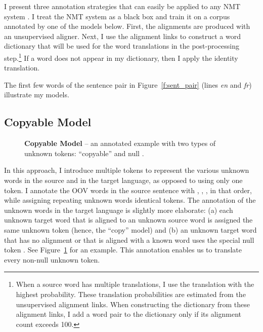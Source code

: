 I present three annotation strategies that can easily be applied to any NMT system \cite{kal13,sutskever14,cho14}. 
I treat the NMT system as a black box and train it on a corpus annotated by one of the models below. 
First, the alignments are produced with an unsupervised aligner. 
Next, I use the alignment links to construct a word dictionary that will 
be used for the word translations in the post-processing step.\footnote{When a source word has multiple translations, I use the translation with the highest probability. These translation probabilities are estimated from the unsupervised alignment links. When constructing the dictionary from these alignment links, I add a word pair to the dictionary only if its alignment count exceeds 100.}
If a word does not appear in my dictionary, then I apply the identity translation.

The first few words of the sentence pair in Figure~\ref{f:sent_pair} (lines {\it en}
and {\it fr}) illustrate my models. 

\subsection{Copyable Model}
\label{subsec:copyable}
\begin{figure}
\caption[Copyable Model]{ {\bf Copyable Model} -- an annotated example with two 
types of unknown tokens: ``copyable''  and null \unknull{}.}
\label{f:copyable}
\end{figure}

In this approach, I introduce multiple tokens to represent the various unknown words in the 
source and in the target language, as opposed to using only one \unksym{} token. 
I annotate the OOV words in the source sentence
with , , , in that order,
while assigning repeating unknown words identical tokens. 
The annotation of the unknown words in the target language is slightly more elaborate: (a) each 
unknown target word that is aligned to an unknown source word
is assigned the same unknown token (hence, the ``copy'' model) and 
(b) an unknown target word that has no 
alignment or that is aligned with a known word uses the special null token \unknull{}. 
See Figure~\ref{f:copyable} for an example.  This annotation enables us to 
translate every non-null unknown token.

